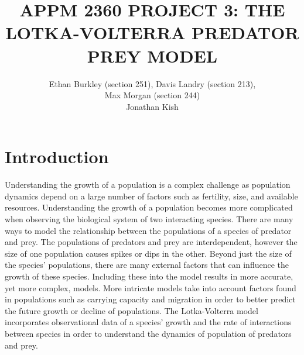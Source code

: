 \documentclass[12pt]{article}   %
\theoremstyle{definition}
\numberwithin{equation}{section}
\begin{document}
\parskip10pt
\parindent0pt
\baselineskip15pt


\title{APPM 2360 PROJECT 3: THE LOTKA-VOLTERRA PREDATOR PREY MODEL}
\author{Ethan Burkley (section 251), Davis Landry (section 213), \\Max Morgan (section 244) \\ Jonathan Kish}


\pagestyle{fancy}
\renewcommand{\sectionmark}[1]{\markright{#1}{}}

\fancyhf{}

\rhead{\fancyplain{}{\thepage}} %
\lhead{\fancyplain{}{\rightmark }} %

\maketitle

\newpage
{}
\setcounter{page}{2}

\section{Introduction} \label{APPM2360proj01sec01}
\quad Understanding the growth of a population is a complex challenge as population dynamics depend on a large number of factors such as fertility, size, and available resources. Understanding the growth of a population becomes more complicated when observing the biological system of two interacting species. There are many ways to model the relationship between the populations of a species of predator and prey. The populations of predators and prey are interdependent, however the size of one population causes spikes or dips in the other. Beyond just the size of the species' populations, there are many external factors that can influence the growth of these species. Including these into the model results in more accurate, yet more complex, models. More intricate models take into account factors found in populations such as carrying capacity and migration in order to better predict the future growth or decline of populations. The Lotka-Volterra model incorporates observational data of a species' growth and the rate of interactions between species in order to understand the dynamics of population of predators and prey. 

\setcounter{page}{2}
\end{document}
